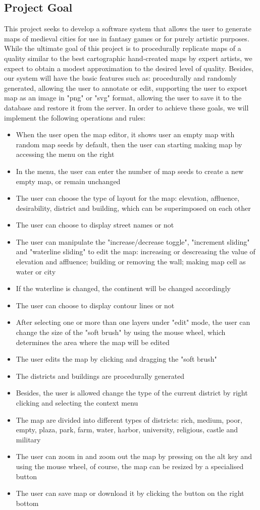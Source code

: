 \subsection{Project Goal}
This project seeks to develop a software system that allows the user to generate maps of medieval cities for use in fantasy games or for purely artistic purposes. While the ultimate goal of this project is to procedurally replicate maps of a quality similar to the best cartographic hand-created maps by expert artists, we expect to obtain a modest approximation to the desired level of quality. Besides, our system will have the basic features such as: procedurally and randomly generated, allowing the user to annotate or edit, supporting the user to export map as an image in "png" or "svg" format, allowing the user to save it to the database and restore it from the server. In order to achieve these goals, we will implement the following operations and rules:
\begin{itemize}
	\item When the user open the map editor, it shows user an empty map with random map seeds by default, then the user can starting making map by accessing the menu on the right
	\item In the menu, the user can enter the number of map seeds to create a new empty map, or remain unchanged
	\item The user can choose the type of layout for the map: elevation, affluence, desirability, district and building, which can be superimposed on each other
  \item The user can choose to display street names or not
  \item The user can manipulate the "increase/decrease toggle", "increment sliding" and "waterline sliding" to edit the map: increasing or descreasing the value of elevation and affluence; building or removing the wall; making map cell as water or city
  \item If the waterline is changed, the continent will be changed accordingly
  \item The user can choose to display contour lines or not
  \item After selecting one or more than one layers under "edit" mode, the user can change the size of the "soft brush" by using the mouse wheel, which determines the area where the map will be edited
  \item The user edits the map by clicking and dragging the "soft brush"
  \item The districts and buildings are procedurally generated
  \item Besides, the user is allowed change the type of the current district by right clicking and selecting the context menu
  \item The map are divided into different types of districts: rich, medium, poor, empty, plaza, park, farm, water, harbor, university, religious, castle and military
  \item The user can zoom in and zoom out the map by pressing on the alt key and using the mouse wheel, of course, the map can be resized by a specialised button
  \item The user can save map or download it by clicking the button on the right bottom
\end{itemize}
